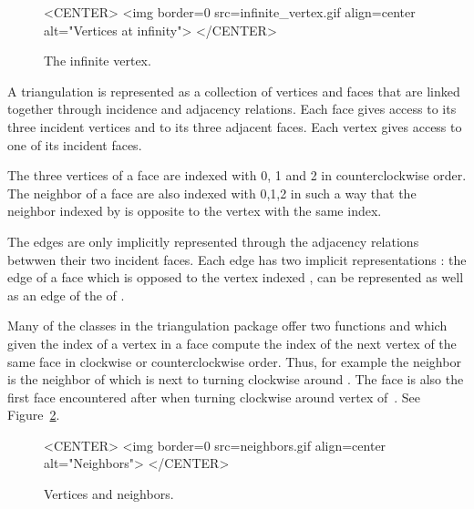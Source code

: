 \begin{figure}
\begin{ccTexOnly}
\begin{center}   \end{center}
\end{ccTexOnly}
\caption{The infinite vertex.
\label{I1_Fig_infinite_vertex}}
\begin{ccHtmlOnly}
<CENTER>
<img border=0 src=infinite_vertex.gif align=center alt="Vertices at
infinity">
</CENTER>
\end{ccHtmlOnly}
\end{figure}

A triangulation is represented as a collection of vertices and faces that
are linked together through incidence and adjacency relations.
Each face gives access to its three incident vertices and to
its 
three adjacent faces. Each vertex gives access to one of its  incident
faces. 

The three vertices of a face are indexed with 0, 1 and 2
in counterclockwise order. The neighbor of a face are also 
indexed with 0,1,2 in such a way that the neighbor indexed by 
is opposite to the vertex with the same index.

The edges  are only implicitly represented
through the adjacency relations betwwen their  two incident
faces. Each edge has two implicit representations : the edge
of a face   which is opposed to the vertex indexed ,
can be represented as well as an edge of the  of 
.


Many of the classes in the triangulation package
offer  two functions  and 
which given the index of a vertex in a face
compute the index of the next vertex  of the same face
in clockwise
or counterclockwise order.
 Thus, for example the neighbor 
 is
 the
neighbor of   which is next to  turning clockwise
around . The face 
is also the first face encountered after  when
turning clockwise around vertex 
of~. See Figure~\ref{I1_Fig_neighbors}.



 \begin{figure}
\begin{ccTexOnly}
    \begin{center}
     
    \end{center}
\end{ccTexOnly} 
    \caption{Vertices and neighbors.
    \label{I1_Fig_neighbors}}
  \begin{ccHtmlOnly}
<CENTER>
<img border=0 src=neighbors.gif align=center alt="Neighbors">
</CENTER>
\end{ccHtmlOnly} 
\end{figure}


